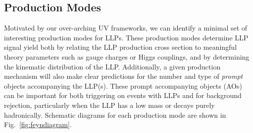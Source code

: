 \subsection{Production Modes}
\label{SM:secProduction_modes}

Motivated by our over-arching UV frameworks, we can identify a minimal set of interesting production modes for LLPs.
These production modes determine LLP signal yield both by relating the  LLP production cross section to meaningful theory parameters such as gauge charges or Higgs couplings, and by determining the kinematic distribution of the LLP.  Additionally, a given production mechanism will also  make clear predictions for the number and type of {\em prompt} objects accompanying the LLP(s).  These prompt accompanying objects (AOs) can be important for both triggering on events with LLPs and for background rejection, particularly when the LLP has a low mass or decays purely hadronically.  Schematic diagrams for each production mode are shown in Fig.~\ref{fig:feyndiagram}.

